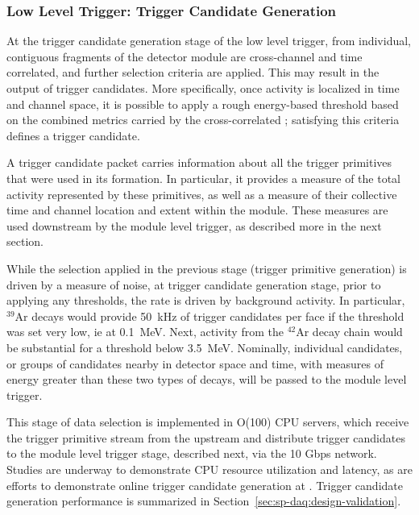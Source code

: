\subsubsection{Low Level Trigger: Trigger Candidate Generation}

At the trigger candidate generation stage of the low level trigger,
 from individual, contiguous fragments of the
detector 
module are cross-channel and time correlated, and further selection
criteria are applied. This may result in the
output of trigger candidates. 
More specifically, once activity is localized in time and channel
space, it is
possible to apply a rough energy-based threshold based on the combined
metrics carried by the cross-correlated ;
satisfying this criteria defines a trigger candidate. 

A trigger candidate packet carries information about all the trigger
primitives that were used in its formation. 
In particular, it provides a measure of the total activity represented
by these primitives, as well as a measure of their collective time and channel
location and extent within the module.
These measures are used downstream by the module level trigger, 
as described more in the next section.

While the selection applied in the previous stage (trigger primitive
generation) is driven by a measure of noise, at trigger candidate
generation stage, prior to applying any thresholds, the rate is driven by
background activity.  
In particular, $^{39}$Ar decays would provide \SI{50}{\kilo\hertz} of
trigger candidates per  face if the threshold was set very low, ie at
\SI{0.1}{\MeV}.
Next, activity from the $^{42}$Ar decay chain would be substantial for a
threshold below \SI{3.5}{\MeV}.
Nominally, individual candidates, or groups of candidates nearby in
detector space and time, with measures of energy greater than these two
types of decays, will be passed to the module level trigger. 

This stage of data selection is
implemented in O(100) CPU servers, which receive the trigger primitive
stream from the upstream  and distribute trigger candidates to the
module level trigger stage, described next, via the 10 Gbps  network. Studies are
underway to demonstrate CPU resource utilization and latency, as are
efforts to demonstrate online trigger candidate generation at .
Trigger candidate generation performance is summarized in
Section~\ref{sec:sp-daq:design-validation}. 

